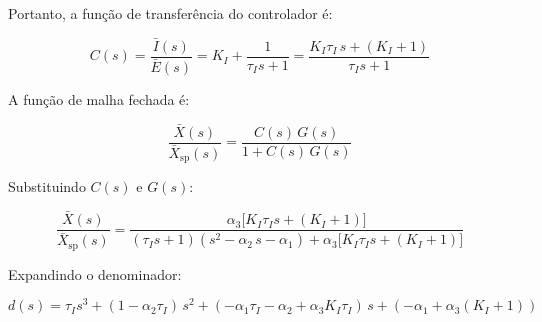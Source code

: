 \begin{frame}
  \small
  Portanto, a função de transferência do controlador é:

  \begin{equation*}
    C(s) = \frac{\bar{I}(s)}{\bar{E}(s)}
    = K_I + \frac{1}{\tau_I s+1}
    = \frac{K_I\tau_I\,s + (K_I+1)}{\tau_I s + 1}
  \end{equation*}

  A função de malha fechada é:

  \begin{equation*}
    \frac{\bar{X}(s)}{\bar{X}_{\text{sp}}(s)}
    = \frac{C(s)\,G(s)}{1+C(s)\,G(s)}
  \end{equation*}

  Substituindo $C(s)$ e $G(s)$:

  \begin{equation*}
    \frac{\bar{X}(s)}{\bar{X}_{\text{sp}}(s)}
    = \frac{\alpha_3\bigl[K_I\tau_I s + (K_I+1)\bigr]}
    {(\tau_I s+1)(s^2 - \alpha_2\,s - \alpha_1)
      + \alpha_3\bigl[K_I\tau_I s + (K_I+1)\bigr]}
  \end{equation*}

  Expandindo o denominador:

  \begin{equation*}
    d(s) = \tau_I s^3
    + (1 - \alpha_2\tau_I)\,s^2
    + (-\alpha_1\tau_I - \alpha_2 + \alpha_3 K_I\tau_I)\,s
    + (-\alpha_1 + \alpha_3(K_I+1))
  \end{equation*}
\end{frame}
